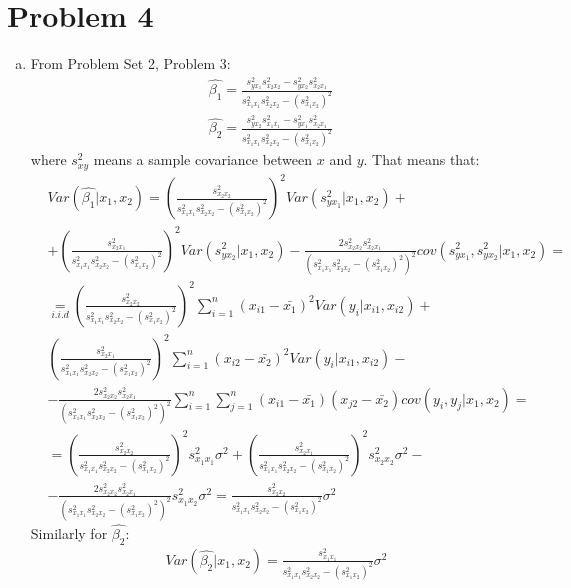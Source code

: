 \documentclass[a4paper]{article}
\newcommand{\summa}{\sum_{i=1}^n}
\begin{document}
\section*{Problem 4}
\begin{enumerate}[(a)]
	\item From Problem Set 2, Problem 3:
	\begin{align*}
	\hat{\beta_1} = \frac{s^2_{yx_1}s^2_{x_2x_2} - s^2_{yx_2}s^2_{x_2x_1}}{s^2_{x_1x_1}s^2_{x_2x_2} - (s^2_{x_1x_2})^2}\\
	\hat{\beta_2} = \frac{s^2_{yx_2}s^2_{x_1x_1} - s^2_{yx_1}s^2_{x_2x_1}}{s^2_{x_1x_1}s^2_{x_2x_2} - (s^2_{x_1x_2})^2}
	\end{align*}
	where $s^2_{xy}$ means a sample covariance between $x$ and $y$. That means that:
	\begin{align}\label{eq4}
	&Var(\hat{\beta_1}|x_1, x_2) = \left(\frac{s^2_{x_2x_2}}{s^2_{x_1x_1}s^2_{x_2x_2} - (s^2_{x_1x_2})^2}\right)^2 Var(s^2_{yx_1}|x_1, x_2) + \nonumber\\
	&+\left(\frac{s^2_{x_2x_1}}{s^2_{x_1x_1}s^2_{x_2x_2} - (s^2_{x_1x_2})^2}\right)^2 Var(s^2_{yx_2}|x_1, x_2) - \frac{2s^2_{x_2x_2}s^2_{x_2x_1}}{(s^2_{x_1x_1}s^2_{x_2x_2} - (s^2_{x_1x_2})^2)^2}cov(s^2_{yx_1}, s^2_{yx_2}|x_1, x_2) = \nonumber\\
	&\underset{i.i.d}{=} \left(\frac{s^2_{x_2x_2}}{s^2_{x_1x_1}s^2_{x_2x_2} - (s^2_{x_1x_2})^2}\right)^2 \summa (x_{i1} - \bar{x_1})^2Var(y_i|x_{i1}, x_{i2}) + \nonumber\\
	&\left(\frac{s^2_{x_2x_1}}{s^2_{x_1x_1}s^2_{x_2x_2} - (s^2_{x_1x_2})^2}\right)^2 \summa (x_{i2} - \bar{x_2})^2Var(y_i|x_{i1}, x_{i2}) -\nonumber\\
	&-\frac{2s^2_{x_2x_2}s^2_{x_2x_1}}{(s^2_{x_1x_1}s^2_{x_2x_2} -(s^2_{x_1x_2})^2)^2} \summa \sum_{j=1}^n (x_{i1} - \bar{x_1})(x_{j2} -\bar{x_2})cov(y_i, y_j|x_{1}, x_2) = \nonumber\\
	&=\left(\frac{s^2_{x_2x_2}}{s^2_{x_1x_1}s^2_{x_2x_2} - (s^2_{x_1x_2})^2}\right)^2 s^2_{x_1x_1} \sigma^2 +
	\left(\frac{s^2_{x_2x_1}}{s^2_{x_1x_1}s^2_{x_2x_2} - (s^2_{x_1x_2})^2}\right)^2 s^2_{x_2x_2} \sigma^2 - \nonumber\\
	&-\frac{2s^2_{x_2x_2}s^2_{x_2x_1}}{(s^2_{x_1x_1}s^2_{x_2x_2} -(s^2_{x_1x_2})^2)^2} s^2_{x_1x_2}\sigma^2 = \frac{s^2_{x_2x_2}}{s^2_{x_1x_1}s^2_{x_2x_2} -(s^2_{x_1x_2})^2}\sigma^2
	\end{align}
	Similarly for $\hat{\beta_2}$:
	\begin{align}\label{eq3}
	&Var(\hat{\beta_2}|x_1, x_2) = \frac{s^2_{x_1x_1}}{s^2_{x_1x_1}s^2_{x_2x_2} -(s^2_{x_1x_2})^2}\sigma^2

\end{align}
\end{enumerate}
\end{document}
